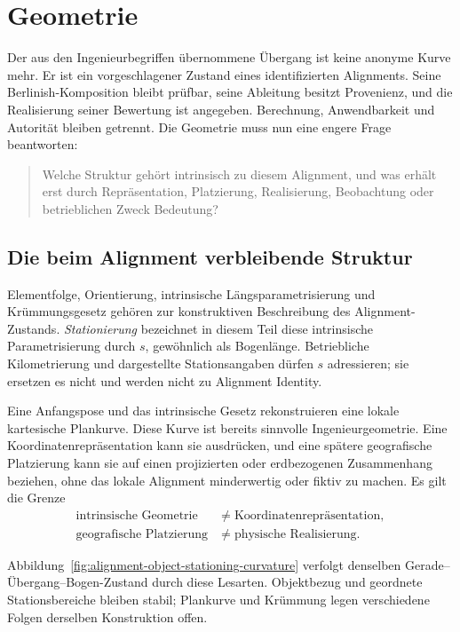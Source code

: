 
\chapter*{Geometrie}
{}

Der aus den Ingenieurbegriffen übernommene Übergang ist keine anonyme Kurve
mehr. Er ist ein vorgeschlagener Zustand eines identifizierten Alignments.
Seine Berlinish-Komposition bleibt prüfbar, seine Ableitung besitzt Provenienz,
und die Realisierung seiner Bewertung ist angegeben. Berechnung,
Anwendbarkeit und Autorität bleiben getrennt. Die Geometrie muss nun eine
engere Frage beantworten:

\begin{quote}
Welche Struktur gehört intrinsisch zu diesem Alignment, und was erhält erst
durch Repräsentation, Platzierung, Realisierung, Beobachtung oder betrieblichen
Zweck Bedeutung?
\end{quote}

\section*{Die beim Alignment verbleibende Struktur}

Elementfolge, Orientierung, intrinsische Längsparametrisierung und
Krümmungsgesetz gehören zur konstruktiven Beschreibung des
Alignment-Zustands. \emph{Stationierung} bezeichnet in diesem Teil diese
intrinsische Parametrisierung durch $s$, gewöhnlich als Bogenlänge.
Betriebliche Kilometrierung und dargestellte Stationsangaben dürfen $s$
adressieren; sie ersetzen es nicht und werden nicht zu Alignment Identity.

Eine Anfangspose und das intrinsische Gesetz rekonstruieren eine lokale
kartesische Plankurve. Diese Kurve ist bereits sinnvolle Ingenieurgeometrie.
Eine Koordinatenrepräsentation kann sie ausdrücken, und eine spätere
geografische Platzierung kann sie auf einen projizierten oder erdbezogenen
Zusammenhang beziehen, ohne das lokale Alignment minderwertig oder fiktiv zu
machen. Es gilt die Grenze
\[
\begin{aligned}
\text{intrinsische Geometrie}&\neq\text{Koordinatenrepräsentation},\\
\text{geografische Platzierung}&\neq\text{physische Realisierung}.
\end{aligned}
\]

Abbildung~\ref{fig:alignment-object-stationing-curvature} verfolgt denselben
Gerade--Übergang--Bogen-Zustand durch diese Lesarten. Objektbezug und geordnete
Stationsbereiche bleiben stabil; Plankurve und Krümmung legen verschiedene
Folgen derselben Konstruktion offen.

